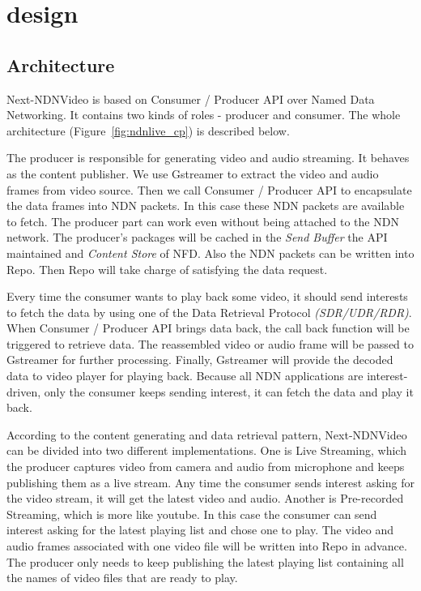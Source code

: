 \vspace{0.3cm}
\section{design} %
\label{sec:design}
\subsection{Architecture}
Next-NDNVideo is based on Consumer / Producer API over Named Data Networking. It contains two kinds of roles - producer and consumer. The whole architecture (Figure~\ref{fig:ndnlive_cp}) is described below.


The producer is responsible for generating video and audio streaming. It behaves as the content publisher. We use Gstreamer to extract the video and audio frames from video source. Then we call Consumer / Producer API to encapsulate the data frames into NDN packets. In this case these NDN packets are available to fetch. The producer part can work even without being attached to the NDN network. The producer's packages will be cached in the \textit{Send Buffer} the API maintained and \textit{Content Store} of NFD\cite{nfd-guide}. Also the NDN packets can be written into Repo\cite{repo-ng}. Then Repo will take charge of satisfying the data request.

Every time the consumer wants to play back some video, it should send interests to fetch the data by using one of the Data Retrieval Protocol \textit{(SDR/UDR/RDR)}. When Consumer / Producer API brings data back, the call back function will be triggered to retrieve data. The reassembled video or audio frame will be passed to Gstreamer for further processing. Finally, Gstreamer will provide the decoded data to video player for playing back. Because all NDN applications are interest-driven, only the consumer keeps sending interest, it can fetch the data and play it back.

According to the content generating and data retrieval pattern, Next-NDNVideo can be divided into two different implementations. One is Live Streaming, which the producer captures video from camera and audio from microphone and keeps publishing them as a live stream. Any time the consumer sends interest asking for the video stream, it will get the latest video and audio. Another is Pre-recorded Streaming, which is more like youtube. In this case the consumer can send interest asking for the latest playing list and chose one to play. The video and audio frames associated with one video file will be written into Repo in advance. The producer only needs to keep publishing the latest playing list containing all the names of video files that are ready to play.

